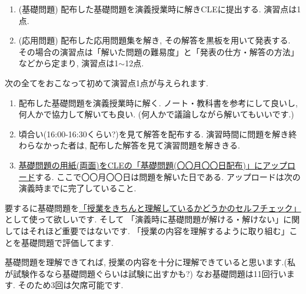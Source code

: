 \documentclass[dvipdfmx,a4paper,11pt]{article}
\theoremstyle{definition}
\begin{document}
\medskip
{}

\begin{enumerate}
  \setlength{\parskip}{0cm} 
  \setlength{\itemsep}{0cm} 
\item (基礎問題) 配布した基礎問題を演義授業時に解きCLEに提出する. 演習点は1点.
\item (応用問題) 配布した応用問題集を解き, その解答を黒板を用いて発表する. その場合の演習点は「解いた問題の難易度」と「発表の仕方・解答の方法」などから定まり, 演習点は1$\sim$12点. 
\end{enumerate}



\medskip
{}

次の全てをおこなって初めて演習点1点が与えられます. 
\begin{enumerate}[label=\textbf{手順}\arabic*.]
  \setlength{\parskip}{0cm} 
  \setlength{\itemsep}{0cm} 
  \item 配布した基礎問題を演義授業時に解く. ノート・教科書を参考にして良いし, 何人かで協力して解いても良い. (何人かで議論しながら解いてもいいです.)
\item 頃合い(16:00-16:30くらい?)を見て解答を配布する. 演習時間に問題を解き終わらなかった者は, 配布した解答を見て演習問題を解ききる. 
 \item \underline{基礎問題の用紙(両面)をCLEの「基礎問題(〇〇月〇〇日配布)」にアップロード}する. ここで〇〇月〇〇日は問題を解いた日である. アップロードは次の演義時までに完了していること.
 \end{enumerate}
 要するに基礎問題を\underline{「授業をきちんと理解しているかどうかのセルフチェック」}として使って欲しいです. 
そして 「演義時に基礎問題が解ける・解けない」に関してはそれほど重要ではないです.
「授業の内容を理解するように取り組む」ことを基礎問題で評価してます. 

基礎問題を理解できてれば, 授業の内容を十分に理解できていると思います.(私が試験作るなら基礎問題ぐらいは試験に出すかも?)
 なお基礎問題は11回行います. そのため3回は欠席可能です. 
\end{document}
